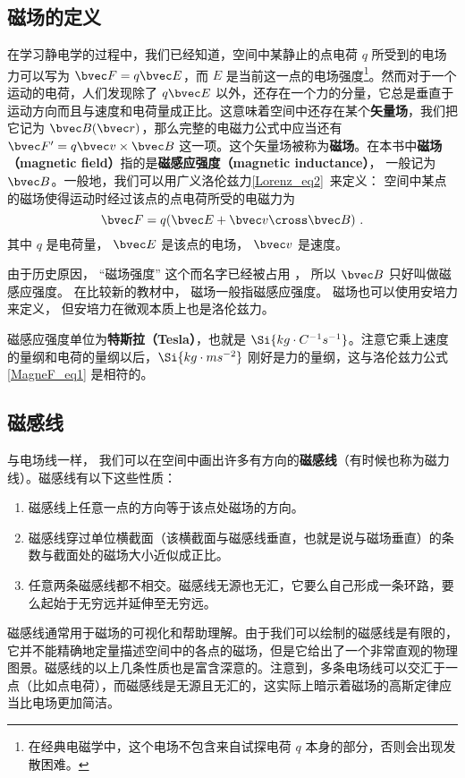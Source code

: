 
\subsection{磁场的定义}
在学习静电学的过程中，我们已经知道，空间中某静止的点电荷 $q$ 所受到的电场力可以写为 $\bvec F=q\bvec E$，而 $E$ 是当前这一点的电场强度\footnote{在经典电磁学中，这个电场不包含来自试探电荷 $q$ 本身的部分，否则会出现发散困难。}。然而对于一个运动的电荷，人们发现除了 $q\bvec E$ 以外，还存在一个力的分量，它总是垂直于运动方向而且与速度和电荷量成正比。这意味着空间中还存在某个\textbf{矢量场}，我们把它记为 $\bvec B(\bvec r)$，那么完整的电磁力公式中应当还有 $\bvec F'=q\bvec v\times \bvec B$ 这一项。这个矢量场被称为\textbf{磁场}。在本书中\textbf{磁场（magnetic field）}指的是\textbf{磁感应强度（magnetic inductance）}， 一般记为 $\bvec B$。一般地，我们可以用广义洛伦兹力\autoref{Lorenz_eq2}~来定义： 空间中某点的磁场使得运动时经过该点的点电荷所受的电磁力为
\begin{equation}\label{MagneF_eq1}
\bvec F = q(\bvec E + \bvec v \cross \bvec B)~.
\end{equation}
其中 $q$ 是电荷量， $\bvec E$ 是该点的电场， $\bvec v$ 是速度。

由于历史原因， “磁场强度” 这个而名字已经被占用%
， 所以 $\bvec B$ 只好叫做磁感应强度。 在比较新的教材中， 磁场一般指磁感应强度。 磁场也可以使用安培力来定义， 但安培力在微观本质上也是洛伦兹力。 


磁感应强度单位为\textbf{特斯拉（Tesla）}，也就是 $\Si{kg\cdot C^{-1}s^{-1}}$。注意它乘上速度的量纲和电荷的量纲以后，$\Si{kg\cdot ms^{-2}}$ 刚好是力的量纲，这与洛伦兹力公式\autoref{MagneF_eq1} 是相符的。
\subsection{磁感线}
与电场线一样， 我们可以在空间中画出许多有方向的\textbf{磁感线}（有时候也称为磁力线）。磁感线有以下这些性质：
\begin{enumerate}
\item 磁感线上任意一点的方向等于该点处磁场的方向。
\item 磁感线穿过单位横截面（该横截面与磁感线垂直，也就是说与磁场垂直）的条数与截面处的磁场大小近似成正比。
\item 任意两条磁感线都不相交。磁感线无源也无汇，它要么自己形成一条环路，要么起始于无穷远并延伸至无穷远。
\end{enumerate}
磁感线通常用于磁场的可视化和帮助理解。由于我们可以绘制的磁感线是有限的，它并不能精确地定量描述空间中的各点的磁场，但是它给出了一个非常直观的物理图景。磁感线的以上几条性质也是富含深意的。注意到，多条电场线可以交汇于一点（比如点电荷），而磁感线是无源且无汇的，这实际上暗示着磁场的高斯定律应当比电场更加简洁。



